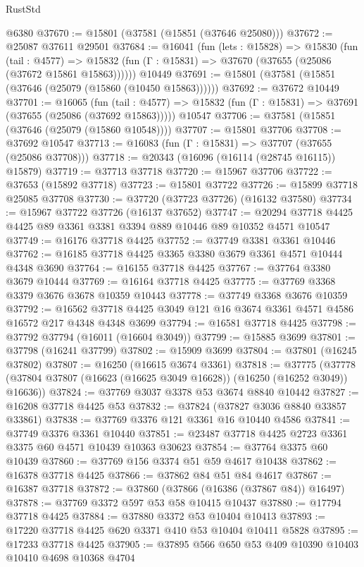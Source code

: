 \begin{lexlean}{RustStd}
\begin{coremodule}
    @6380
@37670 := @15801 (@37581 (@15851 (@37646 @25080)))
@37672 := @25087 @37611 @29501
@37684 := @16041
    (fun (lets : @15828) =>
    @15830
      (fun (tail : @4577) =>
      @15832 (fun (Γ : @15831) => @37670 (@37655 (@25086 (@37672 @15861 @15863))))))
    @10449
@37691 := @15801 (@37581 (@15851 (@37646 (@25079 (@15860 (@10450 @15863))))))
@37692 := @37672 @10449
@37701 := @16065
    (fun (tail : @4577) => @15832 (fun (Γ : @15831) => @37691 (@37655 (@25086 (@37692 @15863)))))
    @10547
@37706 := @37581 (@15851 (@37646 (@25079 (@15860 @10548))))
@37707 := @15801 @37706
@37708 := @37692 @10547
@37713 := @16083 (fun (Γ : @15831) => @37707 (@37655 (@25086 @37708)))
@37718 := @20343 (@16096 (@16114 (@28745 @16115)) @15879)
@37719 := @37713 @37718
@37720 := @15967 @37706
@37722 := @37653 (@15892 @37718)
@37723 := @15801 @37722
@37726 := @15899 @37718 @25085 @37708
@37730 := @37720 (@37723 @37726) (@16132 @37580)
@37734 := @15967 @37722 @37726 (@16137 @37652)
@37747 := @20294 @37718 @4425 @4425 @89 @3361 @3381 @3394 @889 @10446 @89 @10352 @4571 @10547
@37749 := @16176 @37718 @4425
@37752 := @37749 @3381 @3361 @10446
@37762 := @16185 @37718 @4425 @3365 @3380 @3679 @3361 @4571 @10444 @4348 @3690
@37764 := @16155 @37718 @4425
@37767 := @37764 @3380 @3679 @10444
@37769 := @16164 @37718 @4425
@37775 := @37769 @3368 @3379 @3676 @3678 @10359 @10443
@37778 := @37749 @3368 @3676 @10359
@37792 := @16562 @37718 @4425 @3049 @121 @16 @3674 @3361 @4571 @4586 @16572 @217 @4348 @4348 @3699
@37794 := @16581 @37718 @4425
@37798 := @37792 @37794 (@16011 (@16604 @3049))
@37799 := @15885 @3699
@37801 := @37798 (@16241 @37799)
@37802 := @15909 @3699
@37804 := @37801 (@16245 @37802)
@37807 := @16250 (@16615 @3674 @3361)
@37818 := @37775
    (@37778 (@37804 @37807 (@16623 (@16625 @3049 @16628)) (@16250 (@16252 @3049)) @16636))
@37824 := @37769 @3037 @3378 @53 @3674 @8840 @10442
@37827 := @16208 @37718 @4425 @53
@37832 := @37824 (@37827 @3036 @8840 @33857 @33861)
@37838 := @37769 @3376 @121 @3361 @16 @10440 @4586
@37841 := @37749 @3376 @3361 @10440
@37851 := @23487 @37718 @4425 @2723 @3361 @3375 @60 @4571 @10439 @10363 @30623
@37854 := @37764 @3375 @60 @10439
@37860 := @37769 @156 @3374 @51 @59 @4617 @10438
@37862 := @16378 @37718 @4425
@37866 := @37862 @84 @51 @84 @4617
@37867 := @16387 @37718
@37872 := @37860 (@37866 (@16386 (@37867 @84)) @16497)
@37878 := @37769 @3372 @597 @53 @58 @10415 @10437
@37880 := @17794 @37718 @4425
@37884 := @37880 @3372 @53 @10404 @10413
@37893 := @17220 @37718 @4425 @620 @3371 @410 @53 @10404 @10411 @5828
@37895 := @17233 @37718 @4425
@37905 := @37895 @566 @650 @53 @409 @10390 @10403 @10410 @4698 @10368 @4704

\end{coremodule}
\end{lexlean}
